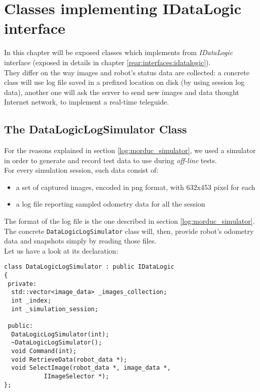 \section{Classes implementing IDataLogic interface}
\label{concr:idatalogic}

In this chapter will be exposed classes which implements
from \textit{IDataLogic} interface (exposed in details
in chapter \ref{rear:interfaces:idatalogic}).
\\
They differ on the way images
and robot's status data are collected: a concrete class
will use log file saved in a prefixed location on disk
(by using session log data),
another one will ask the server to send new images and data
thought Internet network, to implement a real-time teleguide.

\subsection{The DataLogicLogSimulator Class}
\label{concr:idatalogic:datalogiclogsimulator}

For the reasons explained in section \ref{log:morduc_simulator},
we used a \morduc{} simulator in order to generate and record 
test data to use during \textit{off-line} tests.
\\
For every simulation session, such data consist of:

\begin{itemize}
  \item a set of captured images, encoded in png format,
    with 632x453 pixel for each
  \item a log file reporting sampled odometry data
    for all the session
\end{itemize}

The format of the log file is the one described in section 
\ref{log:morduc_simulator}.
\\
The concrete \texttt{DataLogicLogSimulator} class will, then, provide 
robot's odometry data and snapshots simply by reading 
those files.
\\
Let us have a look at its declaration:

\begin{lstlisting}[caption={\texttt{DataLogic} declaration}, label={code:datalogic}, frame=trBL]
class DataLogicLogSimulator : public IDataLogic
{
 private:
  std::vector<image_data> _images_collection;
  int _index;
  int _simulation_session;
  
 public:
  DataLogicLogSimulator(int);
  ~DataLogicLogSimulator();
  void Command(int);
  void RetrieveData(robot_data *);
  void SelectImage(robot_data *, image_data *,
		   IImageSelector *);
};
\end{lstlisting}

